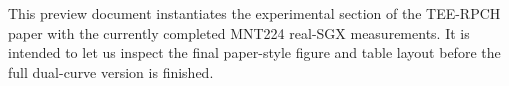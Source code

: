 This preview document instantiates the experimental section of the TEE-RPCH paper with the currently completed MNT224 real-SGX measurements. It is intended to let us inspect the final paper-style figure and table layout before the full dual-curve version is finished.

